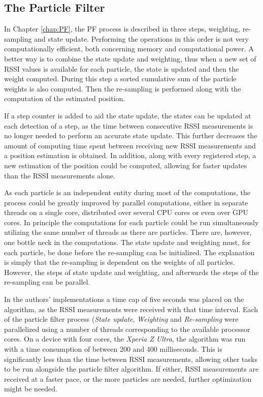 \documentclass{LTHthesis}
\begin{document}
\subsection{The Particle Filter}
%
In Chapter \ref{chap:PF}, the PF process is described in three steps, weighting, re-sampling and state update. Performing the operations in this order is not very computationally efficient, both concerning memory and computational power. A better way is to combine the state update and weighting, thus when a new set of RSSI values is available for each particle, the state is updated and then the weight computed. During this step a sorted cumulative sum of the particle weights is also computed. Then the re-sampling is performed along with the computation of the estimated position.

If a step counter is added to aid the state update, the states can be updated at each detection of a step, as the time between consecutive RSSI measurements is no longer needed to perform an accurate state update. This further decreases the amount of computing time spent between receiving new RSSI measurements and a position estimation is obtained. In addition, along with every registered step, a new estimation of the position could be computed, allowing for faster updates than the RSSI measurements alone. 

As each particle is an independent entity during most of the computations, the process could be greatly improved by parallel computations, either in separate threads on a single core, distributed over several CPU cores or even over GPU cores. In principle the computations for each particle could be run simultaneously utilizing the same number of threads as there are particles. There are, however, one bottle neck in the computations. The state update and weighting must, for each particle, be done before the re-sampling can be initialized. The explanation is simply that the re-sampling is dependent on the weights of all particles. However, the steps of state update and weighting, and afterwards the steps of the re-sampling can be parallel. 

In the authors' implementations a time cap of five seconds was placed on the algorithm, as the RSSI measurements were received with that time interval. Each of the particle filter process (\emph{State update}, \emph{Weighting} and \emph{Re-sampling} were parallelized using a number of threads corresponding to the available processor cores. On a device with four cores, the \emph{Xperia Z Ultra}, the algorithm was run with a time consumption of  between 200 and 400 milliseconds. This is significantly less than the time between RSSI measurements, allowing other tasks to be run alongside the particle filter algorithm. If either, RSSI measurements are received at a faster pace, or the more particles are needed, further optimization might be needed. 
%
\end{document}
